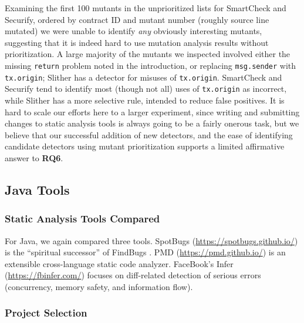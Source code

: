 Examining the first 100 mutants in the unprioritized lists for SmartCheck and Securify, ordered by contract ID and mutant number (roughly source line mutated) we were unable to identify \emph{any} obviously interesting mutants, suggesting that it is indeed hard to use mutation analysis results without prioritization. A large majority of the mutants we inspected involved either the missing
{\tt return} problem noted in the introduction, or replacing {\tt msg.sender} with {\tt tx.origin}; Slither has a detector for misuses of {\tt tx.origin}.  SmartCheck and Securify tend to identify most (though not all) uses of {\tt tx.origin} as incorrect, while Slither has a more selective rule, intended to reduce false positives.
It is hard to scale our efforts here to a larger experiment, since writing and submitting changes to static analysis tools is always going to be a fairly onerous task, but we believe that our successful addition of new detectors, and the ease of identifying candidate detectors using mutant prioritization supports a limited affirmative answer to {\bf RQ6}.

\subsection{Java Tools}

\subsubsection{Static Analysis Tools Compared}

For Java, we again compared three tools.  SpotBugs (\url{https://spotbugs.github.io/}) is the ``spiritual successor'' of FindBugs \cite{FindBugs,CompareJavaTools}.  PMD (\url{https://pmd.github.io/}) \cite{CompareJavaTools} is an extensible cross-language static code analyzer.  FaceBook's Infer (\url{https://fbinfer.com/}) \cite{Infer} focuses on diff-related detection of serious errors (concurrency, memory safety, and information flow).

\subsubsection{Project Selection}

